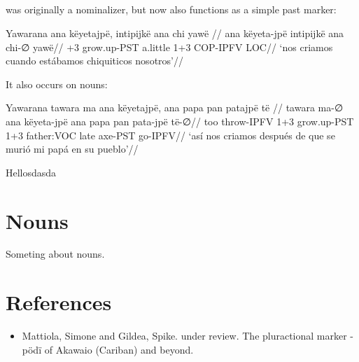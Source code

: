 \documentclass{article}
\begin{document}
\subsection{}

 was originally a nominalizer, but now also functions as a
simple past marker:

 Yawarana 
\begingl
\glpreamble ana këyetajpë, intipijkë ana chi yawë //
\gla ana këyeta-jpë intipijkë ana chi-∅ yawë//
+3 grow.up-PST a.little 1+3 COP-IPFV LOC//
\glft ‘nos criamos cuando estábamos chiquiticos nosotros’//  
\endgl 
\xe

It also occurs on nouns:

 Yawarana 
\begingl
\glpreamble tawara ma ana këyetajpë, ana papa pan patajpë të //
\gla tawara ma-∅ ana këyeta-jpë ana papa pan pata-jpë të-∅//
\glb too throw-IPFV 1+3 grow.up-PST 1+3 father:VOC late axe-PST go-IPFV//
\glft ‘así nos criamos después de que se murió mi papá en su pueblo’//  
\endgl 
\xe

Hellosdasda

\section{Nouns}

Someting about nouns.

\section{References}

\begin{itemize}
\tightlist
\item
  Mattiola, Simone and Gildea, Spike. under review. The pluractional
  marker -pödï of Akawaio (Cariban) and beyond.
\end{itemize}

% 
% 
% 
% 
% 
% 
% 
% 
% 
\end{document}
